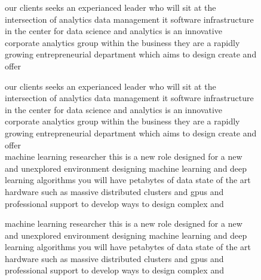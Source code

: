 \documentclass[12pt]{article}
\begin{document}
\begin{figure}[h]
our clients seeks an experianced leader who will sit at the intersection of analytics data management it software infrastructure in the center for data science and analytics is an innovative corporate analytics group within the business they are a rapidly growing entrepreneurial department which aims to design create and offer

{\color{b1}our} {\color{b2}clients} {\color{o1}seeks} {\color{w}an} {\color{o1}experianced} {\color{b2}leader} {\color{b1}who} {\color{w}will} {\color{o1}sit} {\color{w}at} {\color{b1}the} {\color{o1}intersection} {\color{w}of} {\color{b3}analytics} {\color{b1}data} {\color{b2}management} {\color{b1}it} {\color{o2}software} {\color{o3}infrastructure} {\color{w}in} {\color{b1}the} {\color{b2}center} {\color{w}for} {\color{b1}data} {\color{b2}science} {\color{w}and} {\color{b3}analytics} {\color{w}is} {\color{w}an} {\color{b1}innovative} {\color{b2}corporate} {\color{b3}analytics} {\color{o1}group} {\color{b2}within} {\color{b1}the} {\color{b2}business} {\color{b2}they} {\color{w}are} {\color{w}a} {\color{w}rapidly} {\color{b1}growing} {\color{o1}entrepreneurial} {\color{b1}department} {\color{b1}which} {\color{o1}aims} {\color{w}to} {\color{b1}design} {\color{w}create} {\color{w}and} {\color{o1}offer}\\

machine learning researcher this is a new role designed for a new and unexplored environment designing machine learning and deep learning algorithms you will have petabytes of data state of the art hardware such as massive distributed clusters and gpus and professional support to develop ways to design complex and

{\color{o3}machine} {\color{o3}learning} {\color{o1}researcher} {\color{b1}this} {\color{w}is} {\color{w}a} {\color{b1}new} {\color{b2}role} {\color{b1}designed} {\color{w}for} {\color{w}a} {\color{b1}new} {\color{w}and} {\color{o1}unexplored} {\color{w}environment} {\color{o1}designing} {\color{o3}machine} {\color{o3}learning} {\color{w}and} {\color{o2}deep} {\color{o3}learning} {\color{o2}algorithms} {\color{w}you} {\color{w}will} {\color{o1}have} {\color{o1}petabytes} {\color{w}of} {\color{b1}data} {\color{b1}state} {\color{w}of} {\color{b1}the} {\color{o1}art} {\color{o1}hardware} {\color{o2}such} {\color{w}as} {\color{o1}massive} {\color{o2}distributed} {\color{o4}clusters} {\color{w}and} {\color{o1}gpus} {\color{w}and} {\color{w}professional} {\color{w}support} {\color{w}to} {\color{o1}develop} {\color{b1}ways} {\color{w}to} {\color{b1}design} {\color{b1}complex} {\color{w}and}\\


\end{figure}
\end{document}

